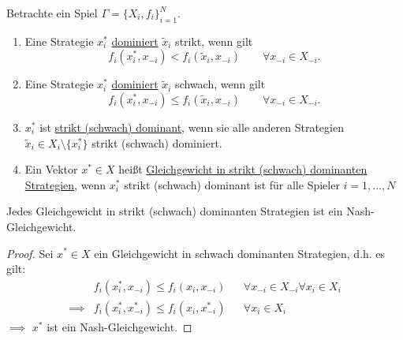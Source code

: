\begin{definition}
	Betrachte ein Spiel $\Gamma = \{X_{i}, f_{i}\}_{i=1}^{N}$.
	\begin{enumerate}[label=\alph{enumi})]
		\item Eine Strategie $x_{i}^{*}$ \underline{dominiert} $\tilde{x}_{i}$ strikt, wenn gilt
			\[
				f_{i}(x_{i}^{*}, x_{-i}) < f_{i}(\tilde{x}_{i}, x_{-i}) \qquad \forall x_{-i} \in X_{-i}
			.\] 
		\item Eine Strategie $x_{i}^{*}$ \underline{dominiert} $\tilde{x}_{i}$ schwach, wenn gilt
			\[
				f_{i}(x_{i}^{*}, x_{-i}) \leq f_{i}(\tilde{x}_{i}, x_{-i}) \qquad \forall x_{-i} \in X_{-i}
			.\] 
		\item $x_{i}^{*}$ ist \underline{strikt (schwach) dominant}, wenn sie alle anderen Strategien $\tilde{x}_{i} \in X_{i} \setminus \{x_{i}^{*}\}$ strikt (schwach) dominiert.
		\item Ein Vektor $x^{*} \in X$ heißt \underline{Gleichgewicht in strikt (schwach) dominanten Strategien}, wenn $x_{i}^{*}$ strikt (schwach) dominant ist für alle Spieler $i=1, \ldots, N$ 
	\end{enumerate}
\end{definition}

\begin{satz}
	Jedes Gleichgewicht in strikt (schwach) dominanten Strategien ist ein Nash-Gleichgewicht.
\end{satz}

\begin{proof}
	Sei $x^{*} \in X$ ein Gleichgewicht in schwach dominanten Strategien, d.h. es gilt:
	\begin{align*}
		&f_{i}(x_{i}^{*}, x_{-i}) \leq f_{i}(x_{i}, x_{-i})& &\forall x_{-i} \in X_{-i} \forall x_{i} \in X_{i} \\
		\implies &f_{i}(x_{i}^{*}, x_{-i}^{*}) \leq f_{i}(x_{i}, x_{-i}^{*})& &\forall x_{i} \in X_{i}
	\end{align*}
	$\implies$ $x^{*}$ ist ein Nash-Gleichgewicht.
\end{proof}

